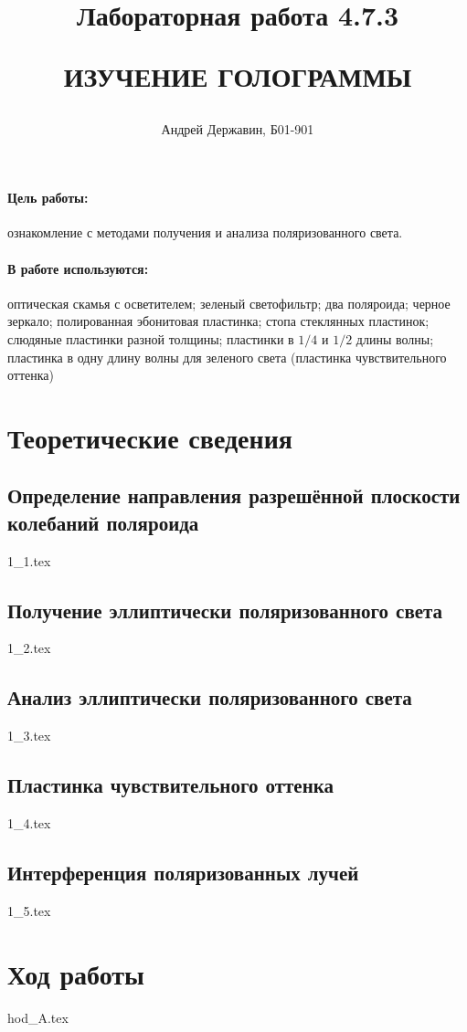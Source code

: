 \documentclass[a5paper,10pt, twoside]{article} %
\title
{
\hfill \break	\hfill \break
\hfill \break	\hfill \break
Лабораторная работа 4.7.3

ИЗУЧЕНИЕ ГОЛОГРАММЫ
}
\author{Андрей Державин, Б01-901}
\begin{document}
\maketitle


\thispagestyle{empty} %

\newpage

\tableofcontents %
\thispagestyle{plain}
\newpage


\paragraph{Цель работы:}

ознакомление с методами получения и анализа поляризованного света.

\paragraph{В работе используются:}

оптическая скамья с осветителем; зеленый светофильтр; два поляроида; черное зеркало; 
полированная эбонитовая пластинка; стопа стеклянных пластинок; слюдяные пластинки 
разной толщины; пластинки в $1/4$ и $1/2$ длины волны; пластинка в одну длину волны для 
зеленого света (пластинка чувствительного оттенка)

\section{Теоретические сведения}

  \subsection{Определение направления разрешённой плоскости колебаний поляроида}
  {1_1.tex}

  \subsection{Получение эллиптически поляризованного света}
  {1_2.tex}

  \subsection{Анализ эллиптически поляризованного света}
  {1_3.tex}

  \subsection{Пластинка чувствительного оттенка}
  {1_4.tex}

  \subsection{Интерференция поляризованных лучей}
  {1_5.tex}
\newpage
\section{Ход работы}
{hod_A.tex}
\end{document}
